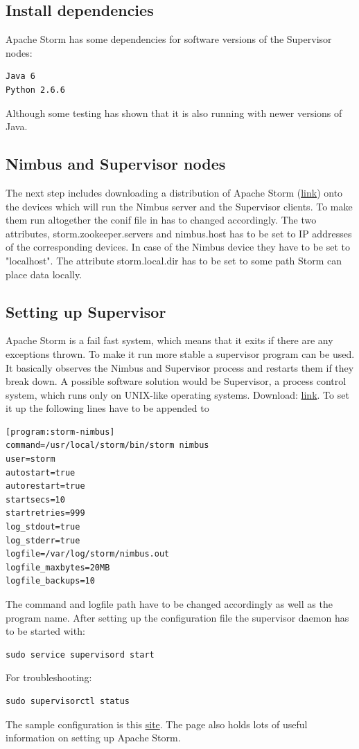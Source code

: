\documentclass[12pt,a4paper]{article}
\begin{document}
\subsection{Install dependencies}
Apache Storm has some dependencies for software versions of the Supervisor nodes:
\begin{verbatim}
Java 6
Python 2.6.6
\end{verbatim}
Although some testing has shown that it is also running with newer versions of Java.
\subsection{Nimbus and Supervisor nodes}
The next step includes downloading a distribution of Apache Storm (\href{http://storm.apache.org/downloads.html}{link}) onto the devices which will run the Nimbus server and the Supervisor clients.
To make them run altogether the conif file in  has to changed accordingly. The two attributes, storm.zookeeper.servers and nimbus.host has to be set to IP addresses of the corresponding devices. In case of the Nimbus device they have to be set to "localhost". The attribute storm.local.dir has to be set to some path Storm can place data locally.
\subsection{Setting up Supervisor}
Apache Storm is a fail fast system, which means that it exits if there are any exceptions thrown. To make it run more stable a supervisor program can be used. It basically observes the Nimbus and Supervisor process and restarts them if they break down. A possible software solution would be Supervisor, a process control system, which runs only on UNIX-like operating systems. Download: \href{http://supervisord.org/#}{link}.
To set it up the following lines have to be appended to 
\begin{verbatim}
[program:storm-nimbus]
command=/usr/local/storm/bin/storm nimbus
user=storm
autostart=true
autorestart=true
startsecs=10
startretries=999
log_stdout=true
log_stderr=true
logfile=/var/log/storm/nimbus.out
logfile_maxbytes=20MB
logfile_backups=10
\end{verbatim}
The command and logfile path have to be changed accordingly as well as the program name. After setting up the configuration file the supervisor daemon has to be started with: 
\begin{verbatim}
sudo service supervisord start
\end{verbatim}
For troubleshooting:
\begin{verbatim}
sudo supervisorctl status
\end{verbatim}
The sample configuration is this \href{http://www.michael-noll.com/tutorials/running-multi-node-storm-cluster/#install-supervisord}{site}. The page also holds lots of useful information on setting up Apache Storm.
\end{document}
